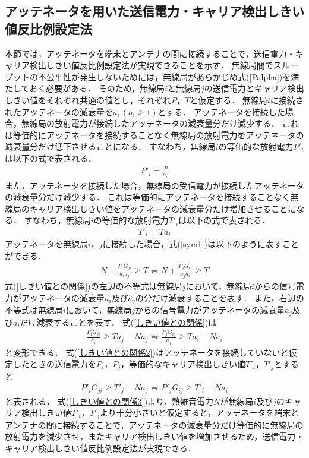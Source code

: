 \documentclass[master]{kuisthesis}		%
\begin{document}
\subsection{アッテネータを用いた送信電力・キャリア検出しきい値反比例設定法}
本節では，アッテネータを端末とアンテナの間に接続することで，送信電力・キャリア検出しきい値反比例設定法が実現できることを示す．
無線局間でスループットの不公平性が発生しないためには，無線局があらかじめ式(\ref{Palpha})を満たしておく必要がある．
そのため，無線局$i$と無線局$j$の送信電力とキャリア検出しきい値をそれぞれ共通の値とし，それぞれ$P$，$T$と仮定する．
無線局$i$に接続されたアッテネータの減衰量を$a_i\,(a_i\geq 1)$とする．
アッテネータを接続した場合，無線局の放射電力が接続したアッテネータの減衰量分だけ減少する．
これは等価的にアッテネータを接続することなく無線局の放射電力をアッテネータの減衰量分だけ低下させることになる．
すなわち，無線局$i$の等価的な放射電力$P'_i$は以下の式で表される．
\begin{align}
P'_i = \frac{P}{a_i} 
\end{align}
また，アッテネータを接続した場合，無線局の受信電力が接続したアッテネータの減衰量分だけ減少する．
これは等価的にアッテネータを接続することなく無線局のキャリア検出しきい値をアッテネータの減衰量分だけ増加させることになる．
すなわち，無線局$i$の等価的な放射電力$T'_i$は以下の式で表される．
\begin{align}
T'_i = Ta_i 
\end{align}
アッテネータを無線局$i$，$j$に接続した場合，式(\ref{sym1})は以下のように表すことができる．
\begin{align}\label{しきい値との関係}
N + \frac{P_i G_{ji}}{a_ia_j} \geq T  \Leftrightarrow  N + \frac{P_j G_{ij}}{a_ja_i} \geq T
\end{align}
式(\ref{しきい値との関係})の左辺の不等式は無線局$j$において，無線局$i$からの信号電力がアッテネータの減衰量$a_i$及び$a_j$の分だけ減衰することを表す．
また，右辺の不等式は無線局$i$において，無線局$j$からの信号電力がアッテネータの減衰量$a_j$及び$a_i$だけ減衰することを表す．
式(\ref{しきい値との関係})は
\begin{align}\label{しきい値との関係2}
\frac{P_iG_{ji}}{a_i} \geq T a_j - Na_j  \Leftrightarrow  \frac{P_j G_{ij}}{a_j} \geq Ta_i - Na_i 
\end{align}
と変形できる．
式(\ref{しきい値との関係2})はアッテネータを接続していないと仮定したときの送信電力を$P_i$，$P_j$，等価的なキャリア検出しきい値$T'_i$，$T'_j$とすると
\begin{align}\label{しきい値との関係3}
{P'_i G_{ji}} \geq T'_j - Na_j  \Leftrightarrow  {P'_j G_{ij}} \geq T'_i - Na_i 
\end{align}
と表される．
式(\ref{しきい値との関係3})より，熱雑音電力$N$が無線局$i$及び$j$のキャリア検出しきい値$T'_i$，$T'_j$より十分小さいと仮定すると，アッテネータを端末とアンテナの間に接続することで，アッテネータの減衰量分だけ等価的に無線局の放射電力を減少させ，またキャリア検出しきい値を増加させるため，送信電力・キャリア検出しきい値反比例設定法が実現できる．
\end{document}
